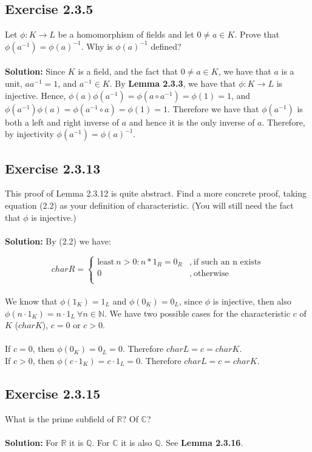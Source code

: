 \documentclass{article}
\begin{document}
\subsection*{Exercise 2.3.5}
Let $\phi : K \rightarrow L$ be a homomorphism of fields and let
$0 \neq a \in K$. Prove that $\phi(a^{-1}) = \phi(a)^{-1}$.
Why is $\phi(a)^{-1}$ defined?
\\\\
\textbf{Solution:}
Since $K$ is a field, and the fact that $0 \neq a \in K$, we have that $a$ is a unit, $aa^{-1}=1$, and $a^{-1} \in K$.
By \textbf{Lemma 2.3.3}, we have that $\phi: K \rightarrow L$ is injective. Hence, $\phi(a)\phi(a^{-1}) = \phi(a \circ a^{-1}) = \phi(1) = 1$, and
$\phi(a^{-1})\phi(a) = \phi(a^{-1} \circ a) = \phi(1) = 1$. Therefore we have that $\phi(a^{-1})$ is both a left and right inverse
of $a$ and hence it is the only inverse of $a$. Therefore, by injectivity $\phi(a^{-1}) = \phi(a)^{-1}$.

\subsection*{Exercise 2.3.13}
This proof of Lemma 2.3.12 is quite abstract. Find
a more concrete proof, taking equation (2.2) as your definition of
characteristic. (You will still need the fact that $\phi$ is injective.)
\\\\
\textbf{Solution:}
By (2.2) we have:

\[ char R = 
    \begin{cases} 
        \text{least}\ n>0: n*1_R = 0_R & ,\ \text{if such an n exists} \\
        0 & ,\ \text{otherwise} \\
    \end{cases}
\]
\\
We know that $\phi(1_K) = 1_L$ and $\phi(0_K) = 0_L$, since $\phi$ is injective, then also
$\phi(n\cdot 1_K) = n \cdot 1_L \ \forall n \in \mathbb{N}$. We have two possible cases for the characteristic $c$ of $K$ ($char K$),
$c = 0$ or $c > 0$.\\\\
If $c=0$, then $\phi(0_K) = 0_L = 0$. Therefore $char L = c = char K$.\\
If $c>0$, then $\phi(c \cdot 1_K) = c\cdot 1_L = 0$. Therefore $char L = c = char K$.

\subsection*{Exercise 2.3.15}
What is the prime subfield of $\mathbb{R}$? Of $\mathbb{C}$?
\\\\
\textbf{Solution:}
For $\mathbb{R}$ it is $\mathbb{Q}$. For $\mathbb{C}$ it is also $\mathbb{Q}$.
See \textbf{Lemma 2.3.16}.
\end{document}
